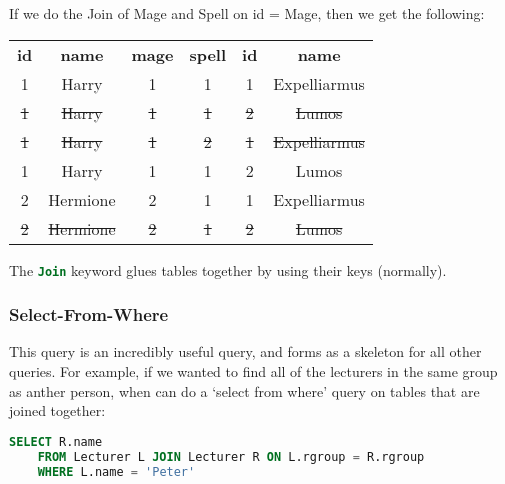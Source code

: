 \documentclass[11pt,a4paper,titlepage,dvipsnames,cmyk]{scrartcl}
\begin{document}
If we do the Join of Mage and Spell on id = Mage, then we get the
following:
\begin{center}
    \begin{tabular}{|c|c|c|c|c|c|}
        \hline
        \textbf{id} & \textbf{name} & \textbf{mage} & \textbf{spell} &
        \textbf{id} & \textbf{name} \\ \hhline{|=|=|=|=|=|=|}
        1 & Harry & 1 & 1 & 1 & Expelliarmus \\ \hline
        \color{red}\st{1} & \color{red}\st{Harry} & \color{red}\st{1} &
        \color{red}\st{1} & \color{red}\st{2} & \color{red}\st{Lumos} \\ \hline
        \color{red}\st{1} & \color{red}\st{Harry} & \color{red}\st{1} &
        \color{red}\st{2} & \color{red}\st{1} & \color{red}\st{Expelliarmus} \\ \hline
        1 & Harry & 1 & 1 & 2 & Lumos \\
        \hline
        2 & Hermione & 2 & 1 & 1 & Expelliarmus \\ \hline
        \color{red}\st{2} & \color{red}\st{Hermione} & \color{red}\st{2} & \color{red}\st{1} & \color{red}\st{2} & \color{red}\st{Lumos} \\ \hline

    \end{tabular}
\end{center}

The \lstinline[language=SQL]|Join| keyword glues tables together by using
their keys (normally).

\subsubsection{Select-From-Where}%
\label{ssub:Select-From-Where}
This query is an incredibly useful query, and forms as a skeleton for all
other queries. For example, if we wanted to find all of the lecturers in
the same group as anther person, when can do a `select from where' query
on tables that are joined together:

\begin{lstlisting}[language=SQL]
SELECT R.name
    FROM Lecturer L JOIN Lecturer R ON L.rgroup = R.rgroup
    WHERE L.name = 'Peter'
\end{lstlisting}
\end{document}
